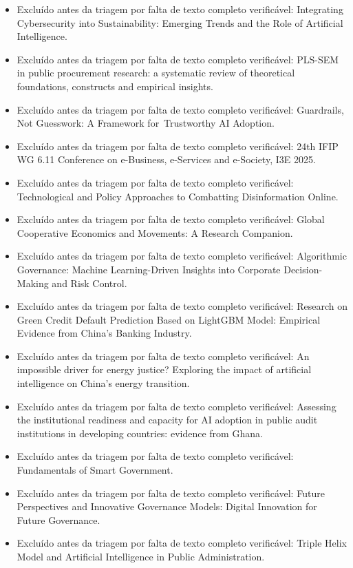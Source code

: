 \documentclass[12pt,a4paper]{article}
\begin{document}
\begin{itemize}
\item Excluído antes da triagem por falta de texto completo verificável: Integrating Cybersecurity into Sustainability: Emerging Trends and the Role of Artificial Intelligence.
\item Excluído antes da triagem por falta de texto completo verificável: PLS-SEM in public procurement research: a systematic review of theoretical foundations, constructs and empirical insights.
\item Excluído antes da triagem por falta de texto completo verificável: Guardrails, Not Guesswork: A Framework for Trustworthy AI Adoption.
\item Excluído antes da triagem por falta de texto completo verificável: 24th IFIP WG 6.11 Conference on e-Business, e-Services and e-Society, I3E 2025.
\item Excluído antes da triagem por falta de texto completo verificável: Technological and Policy Approaches to Combatting Disinformation Online.
\item Excluído antes da triagem por falta de texto completo verificável: Global Cooperative Economics and Movements: A Research Companion.
\item Excluído antes da triagem por falta de texto completo verificável: Algorithmic Governance: Machine Learning-Driven Insights into Corporate Decision-Making and Risk Control.
\item Excluído antes da triagem por falta de texto completo verificável: Research on Green Credit Default Prediction Based on LightGBM Model: Empirical Evidence from China's Banking Industry.
\item Excluído antes da triagem por falta de texto completo verificável: An impossible driver for energy justice? Exploring the impact of artificial intelligence on China's energy transition.
\item Excluído antes da triagem por falta de texto completo verificável: Assessing the institutional readiness and capacity for AI adoption in public audit institutions in developing countries: evidence from Ghana.
\item Excluído antes da triagem por falta de texto completo verificável: Fundamentals of Smart Government.
\item Excluído antes da triagem por falta de texto completo verificável: Future Perspectives and Innovative Governance Models: Digital Innovation for Future Governance.
\item Excluído antes da triagem por falta de texto completo verificável: Triple Helix Model and Artificial Intelligence in Public Administration.

\end{itemize}
\end{document}
